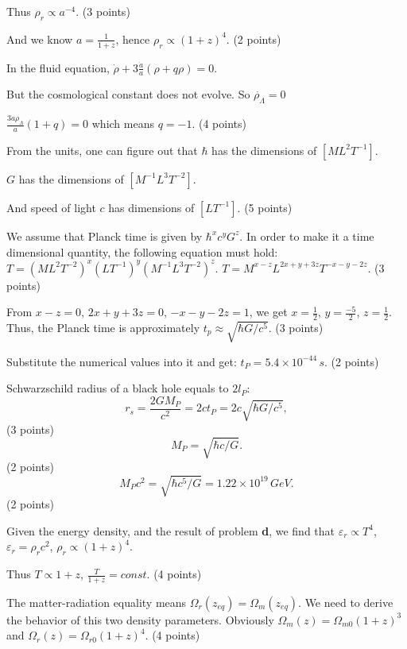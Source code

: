 \begin{description}
  Thus $\rho_r \propto a^{-4}$. \hfill(3 points)

  And we know $a = \frac{1}{1+z}$, hence $\rho_r \propto (1+z)^4$.
  \hfill(2 points)

\item[(e)] In the fluid equation,
  $\dot{\rho} + 3\frac{\dot{a}}{a}(\rho + q\rho) = 0$.

  But the cosmological constant does not evolve. So
  $\dot{\rho_\Lambda} = 0$

  $\frac{3\dot{a}\rho_\Lambda}{a}(1 + q) = 0$ which means $q = -1$.
  \hfill(4 points)

\item[(f)] From the units, one can figure out that $\hbar$ has the
  dimensions of $[ML^2T^{-1}]$.

  $G$ has the dimensions of $[M^{-1}L^3T^{-2}]$.

  And speed of light $c$ has dimensions of $[LT^{-1}]$. \hfill(5 points)

  We assume that Planck time is given by $\hbar^x c^y G^z$. In order to
  make it a time dimensional quantity, the following equation must hold:
  $T = (ML^2T^{-2})^x(LT^{-1})^y(M^{-1}L^3T^{-2})^z$.
  $T = M^{x-z}L^{2x+y+3z}T^{-x-y-2z}$. \hfill(3 points)

  From $x - z = 0$, $2x + y + 3z = 0$, $-x - y - 2z = 1$, we get
  $x = \frac{1}{2}$, $y = \frac{-5}{2}$, $z = \frac{1}{2}$. Thus, the
  Planck time is approximately $t_p \approx \sqrt{\hbar G/c^5}$.
  \hfill(3 points)

  Substitute the numerical values into it and get:
  $t_P = 5.4\times 10^{-44}\,s$. \hfill(2 points)

\item[(g)] Schwarzschild radius of a black hole equals to $2l_P$:
  \[ r_s = \frac{2GM_P}{c^2} = 2ct_P = 2c\sqrt{\hbar G/c^5}, \]
  \hfill(3 points)
  \[ M_P = \sqrt{\hbar c/G}. \]
  \hfill(2 points)
  \[ M_P c^2 = \sqrt{\hbar c^5/G} = 1.22\times 10^{19}\,GeV. \]
  \hfill(2 points)

\item[(h)] Given the energy density, and the result of problem \textbf{d},
  we find that $\varepsilon_r \propto T^4$,
  $\varepsilon_r = \rho_r c^2$, $\rho_r \propto (1+z)^4$.

  Thus $T \propto 1 + z$, $\frac{T}{1+z} = const$. \hfill(4 points)

\item[(i)] The matter-radiation equality means
  $\Omega_r(z_{eq}) = \Omega_m(z_{eq})$. We need to derive the behavior of
  this two density parameters. Obviously
  $\Omega_m(z) = \Omega_{m0}(1+z)^3$ and
  $\Omega_r(z) = \Omega_{r0}(1+z)^4$. \hfill(4 points)


\end{description}
